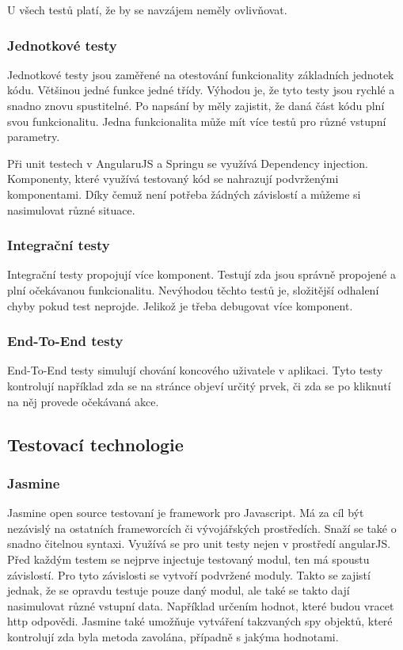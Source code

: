 \documentclass[czech,master,public,dept460,male,cpdeclaration,twoside]{diploma}
\begin{document}
U všech testů platí, že by se navzájem neměly ovlivňovat.

\subsubsection{Jednotkové testy}
Jednotkové testy jsou zaměřené na otestování funkcionality základních jednotek kódu. Většinou jedné funkce jedné třídy. Výhodou je, že tyto testy jsou rychlé a snadno znovu spustitelné. Po napsání by měly zajistit, že daná část kódu plní svou funkcionalitu. Jedna funkcionalita může mít více testů pro různé vstupní parametry.

Při unit testech v AngularuJS a Springu se využívá Dependency injection. Komponenty, které využívá testovaný kód se nahrazují podvrženými komponentami. Díky čemuž není potřeba žádných závislostí a můžeme si nasimulovat různé situace.

\subsubsection{Integrační testy}
Integrační testy propojují více komponent. Testují zda jsou správně propojené a plní očekávanou funkcionalitu. Nevýhodou těchto testů je, složitější odhalení chyby pokud test neprojde. Jelikož je třeba debugovat více komponent. 

\subsubsection{End-To-End testy}
End-To-End testy simulují chování koncového uživatele v aplikaci. Tyto testy kontrolují například zda se na stránce objeví určitý prvek, či zda se po kliknutí na něj provede očekávaná akce.

\subsection{Testovací technologie}
\subsubsection{Jasmine}
Jasmine open source testovaní je framework pro Javascript. Má za cíl být nezávislý na ostatních frameworcích či vývojářských prostředích. Snaží se také o snadno čitelnou syntaxi. Využívá se pro unit testy nejen v prostředí angularJS. Před každým testem se nejprve injectuje testovaný modul, ten má spoustu závislostí. Pro tyto závislosti se vytvoří podvržené moduly. Takto se zajistí jednak, že se opravdu testuje pouze daný modul, ale také se takto dají nasimulovat různé vstupní data. Například určením hodnot, které budou vracet http odpovědi. Jasmine také umožňuje vytváření takzvaných spy objektů, které kontrolují zda byla metoda zavolána, případně s jakýma hodnotami.
\end{document}
